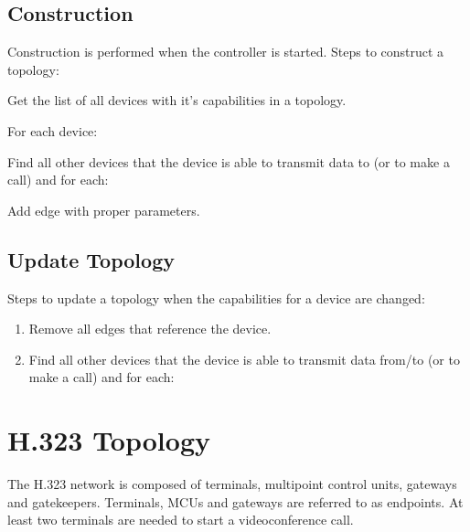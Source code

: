 \documentclass[a4paper]{report}
\begin{document}
      
\subsection{Construction}

Construction is performed when the controller is started. Steps to construct a topology:

\begin{enumerate}

\item Get the list of all devices with it's capabilities in a topology.

\item For each device: 
  \begin{compactitem}
  \item Find all other devices that the device is able to transmit
  data to (or to make a call) and for each:
    \begin{compactitem}
    \item Add edge with proper parameters.
    \end{compactitem}
  \end{compactitem}

\end{enumerate}     

     
\subsection{Update Topology}     

Steps to update a topology when the capabilities for a device are changed:
\begin{enumerate}

\item Remove all edges that reference the device.

\item Find all other devices that the device is able to transmit data from/to
   (or to make a call) and for each:

\end{enumerate}  


\section{H.323 Topology}

The H.323 network is composed of terminals, multipoint control units, gateways and gatekeepers. Terminals, MCUs and gateways are referred to as endpoints. At least two terminals are needed to start a videoconference call.
\end{document}
